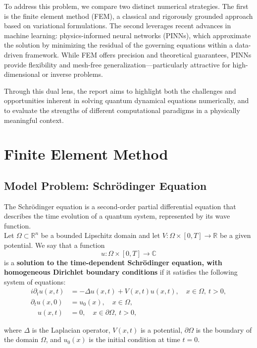\documentclass{article}
\theoremstyle{definition}
\theoremstyle{plain}
\theoremstyle{remark}
\begin{document}
To address this problem, we compare two distinct numerical strategies. The first is the finite element method (FEM), a classical and rigorously grounded approach based on variational formulations. The second leverages recent advances in machine learning: physics-informed neural networks (PINNs), which approximate the solution by minimizing the residual of the governing equations within a data-driven framework. While FEM offers precision and theoretical guarantees, PINNs provide flexibility and mesh-free generalization—particularly attractive for high-dimensional or inverse problems.

Through this dual lens, the report aims to highlight both the challenges and opportunities inherent in solving quantum dynamical equations numerically, and to evaluate the strengths of different computational paradigms in a physically meaningful context.

\newpage

\section{Finite Element Method}

\subsection*{Model Problem: Schrödinger Equation}

The Schrödinger equation is a second-order partial differential equation that describes the time evolution of a quantum system, represented by its wave function. \\
Let $\Omega \subset \mathbb{R}^n$ be a bounded Lipschitz domain and let $V : \Omega \times [0,T] \to \mathbb{R}$ be a given potential. We say that a function
\[
u : \Omega \times [0,T] \to \mathbb{C}
\]
is a \textbf{solution to the time-dependent Schrödinger equation, with homogeneous Dirichlet boundary conditions} if it satisfies the following system of equations:
\begin{align*}
    i \partial_t u(x,t) &= - \Delta u(x,t) + V(x,t) u(x,t), \quad x \in \Omega, \ t > 0,\\
    \partial_t u(x,0) &= u_0(x), \quad x \in \Omega,\\
    \quad u(x,t) &= 0, \quad x \in \partial \Omega, \ t > 0,
\end{align*}


where $\Delta$ is the Laplacian operator, $V(x,t)$ is a potential, $\partial \Omega$ is the boundary of the domain $\Omega$, and $u_0(x)$ is the initial condition at time $t=0$. 
\end{document}
